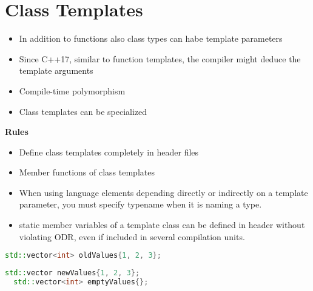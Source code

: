 

\section{Class Templates}

\begin{itemize}
  \itemsep 0em 
  \item In addition to functions also class types can habe template parameters
  \item Since C++17, similar to function templates, the compiler might deduce the template arguments
  \item Compile-time polymorphism
  \item Class templates can be specialized
\end{itemize}

\textbf{Rules} \\
\begin{itemize}
  \itemsep 0em 
  \item Define class templates completely in header files
  \item Member functions of class templates
  \item When using language elements depending directly or indirectly on a template parameter, you must specify typename when it is naming a type.
  \item static member variables of a template class can be defined in header without violating ODR, even if included in several compilation units.
 
\end{itemize}


\begin{minipage}{0,5\linewidth}
  \begin{lstlisting}[language=C++]
  std::vector<int> oldValues{1, 2, 3};
  \end{lstlisting}
\end{minipage}
\begin{minipage}{0,5\linewidth}
  \begin{lstlisting}[language=C++]
  std::vector newValues{1, 2, 3};
  std::vector<int> emptyValues{};
  \end{lstlisting}
\end{minipage}

